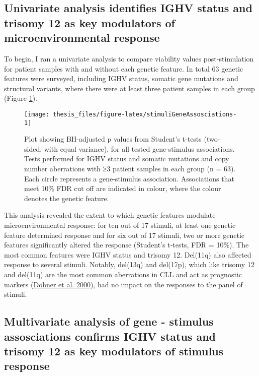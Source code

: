 \documentclass[11pt, a4paper, twosided]{book}
\begin{document}
\hypertarget{univariate-analysis-identifies-ighv-status-and-trisomy-12-as-key-modulators-of-microenvironmental-response}{%
\subsection{Univariate analysis identifies IGHV status and trisomy 12 as key modulators of microenvironmental response}\label{univariate-analysis-identifies-ighv-status-and-trisomy-12-as-key-modulators-of-microenvironmental-response}}

To begin, I ran a univariate analysis to compare viability values post-stimulation for patient samples with and without each genetic feature. In total 63 genetic features were surveyed, including IGHV status, somatic gene mutations and structural variants, where there were at least three patient samples in each group (Figure \ref{fig:stimuliGeneAssosciations}).


\begin{figure}

{\centering \texttt{[image: thesis\_files/figure-latex/stimuliGeneAssosciations-1]} 

}

\caption{Plot showing BH-adjusted p values from Student's t-tests (two-sided, with equal variance), for all tested gene-stimulus associations. Tests performed for IGHV status and somatic mutations and copy number aberrations with ≥3 patient samples in each group (n = 63). Each circle represents a gene-stimulus association. Associations that meet 10\% FDR cut off are indicated in colour, where the colour denotes the genetic feature.}\label{fig:stimuliGeneAssosciations}
\end{figure}
This analysis revealed the extent to which genetic features modulate microenvironmental response: for ten out of 17 stimuli, at least one genetic feature determined response and for six out of 17 stimuli, two or more genetic features significantly altered the response (Student's t-tests, FDR = 10\%). The most common features were IGHV status and trisomy 12. Del(11q) also affected response to several stimuli. Notably, del(13q) and del(17p), which like trisomy 12 and del(11q) are the most common aberrations in CLL and act as prognostic markers (\protect\hyperlink{ref-Dohner2000}{Döhner et al. 2000}), had no impact on the responses to the panel of stimuli.

\hypertarget{multivariate-analysis-of-gene---stimulus-assosciations-confirms-ighv-status-and-trisomy-12-as-key-modulators-of-stimulus-response}{%
\subsection{Multivariate analysis of gene - stimulus assosciations confirms IGHV status and trisomy 12 as key modulators of stimulus response}\label{multivariate-analysis-of-gene---stimulus-assosciations-confirms-ighv-status-and-trisomy-12-as-key-modulators-of-stimulus-response}}
\end{document}
